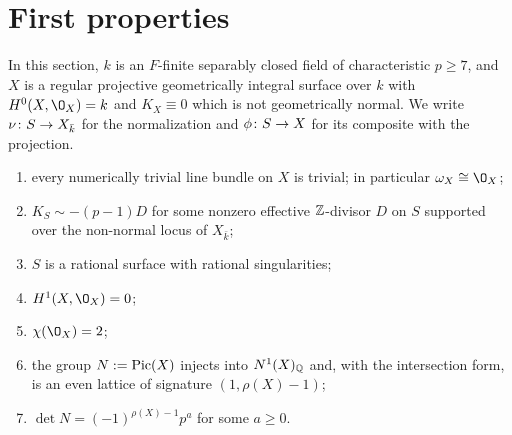\section{First properties}\label{sec:torsors}
\begin{assumption}\label{ass:nonnormal}
In this section, $k$ is an $F$-finite separably closed field of characteristic $p\geq 7$, and $X$ is a regular projective geometrically integral surface over $k$ with $H^0(X,\O_X) = k$ and $K_X\equiv 0$ which is not geometrically normal.
We write $\nu\colon S\to X_{\bar k}$ for the normalization and $\phi\colon S\to X$ for its composite with the projection.
\end{assumption}

\begin{proposition}\label{prop:cohomology}
\begin{enumerate}[label=\textup{(\arabic*)}]
\item every numerically trivial line bundle on $X$ is trivial; in particular $\omega_X\cong\O_X$;
\item $K_S\sim -(p-1)D$ for some nonzero effective $\mathbb{Z}$-divisor $D$ on $S$ supported over the non-normal locus of $X_{\bar k}$;
\item $S$ is a rational surface with rational singularities;
\item $H^1(X,\O_X) = 0$;
\item $\chi(\O_X) = 2$;
\item the group $N := \operatorname{Pic}(X)$ injects into $N^1(X)_{\mathbb{Q}}$ and, with the intersection form, is an even lattice of signature $(1,\rho(X)-1)$;
\item $\det N = (-1)^{\rho(X)-1}p^a$ for some $a\geq 0$.
\end{enumerate}
\end{proposition}

